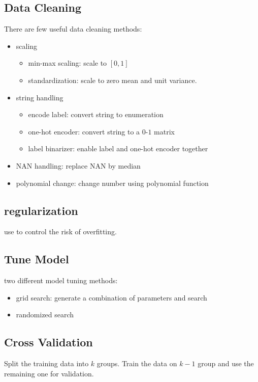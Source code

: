 \subsection{Data Cleaning}

There are few useful data cleaning methods:
\begin{itemize}
	\item scaling
		\begin{itemize}
			\item min-max scaling: scale to $[0,1]$
			\item standardization: scale to zero mean and unit variance.
		\end{itemize}
	\item string handling
		\begin{itemize}
			\item encode label: convert string to enumeration
			\item one-hot encoder: convert string to a $0$-$1$ matrix
			\item label binarizer: enable label and one-hot encoder together
		\end{itemize}
	\item NAN handling: replace NAN by median
	\item polynomial change: change number using polynomial function
\end{itemize}

\subsection{regularization}

use  to control the risk of overfitting.


\subsection{Tune Model}
two different model tuning methods:
\begin{itemize}
	\item grid search: generate a combination of parameters and search
	\item randomized search
\end{itemize}



\subsection{Cross Validation}

Split the training data into $k$ groups. Train the data on $k-1$ group and use the remaining one for validation.

